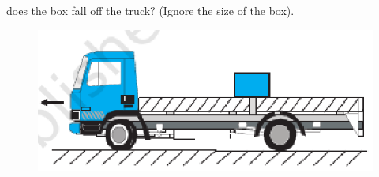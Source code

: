 \begin{enumerate}[label=\arabic*.,ref=\thesection.\theenumi]
does the box fall off the truck? (Ignore the size of the box).
\begin{figure}[!ht]
\centering
\includegraphics[width=\columnwidth]{./figs/11-1/5/5.22.eps}
\caption{}
\label{fig:5.22}
\end{figure} 
\end{enumerate}

